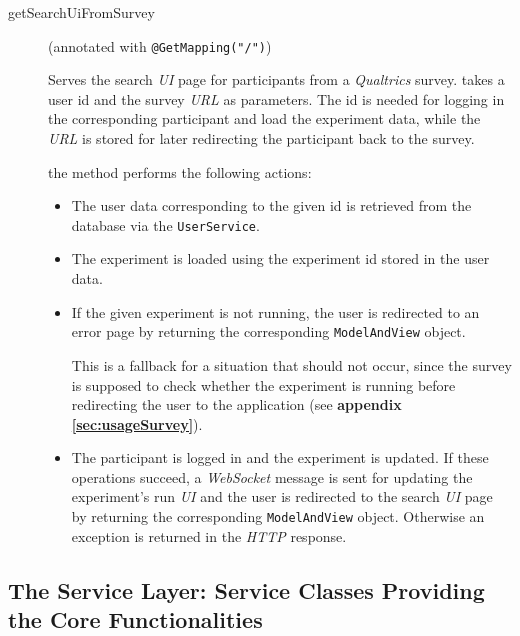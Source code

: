 \documentclass[a4paper]{usiinfbachelorproject}
\begin{document}
    \begin{description}

        \item[getSearchUiFromSurvey]
        (annotated with \texttt{@GetMapping("/")})

        Serves the search \emph{UI} page for participants from a \emph{Qualtrics} survey.
        takes a user id and the survey \emph{URL} as parameters. The id is needed for logging in the corresponding participant
        and load the experiment data,
        while the \emph{URL} is stored for later redirecting the participant back to the survey.

        the method performs the following actions:

        \begin{itemize}

            \item
            The user data corresponding to the given id is retrieved from the database via the \texttt{UserService}.

            \item
            The experiment is loaded using the experiment id stored in the user data.

            \item
            If the given experiment is not running, the user is redirected to an error page by returning the
            corresponding \texttt{ModelAndView} object. 

            This is a fallback for a situation that should not occur,
            since the survey is supposed to check whether the experiment is running before redirecting the user to the application
            (see \textbf{appendix \ref{sec:usageSurvey}}).

            \item
            The participant is logged in and the experiment is updated. If these operations succeed, 
            a \emph{WebSocket} message is sent for updating the experiment's run \emph{UI} and the user is redirected to the search \emph{UI}
            page by returning the corresponding \texttt{ModelAndView} object. Otherwise an exception is returned in the \emph{HTTP} response.
            

        \end{itemize} 

    \end{description}


\subsection{\textbf{The Service Layer: Service Classes Providing the Core Functionalities}} \label{sec:archServiceLayer}
\end{document}
